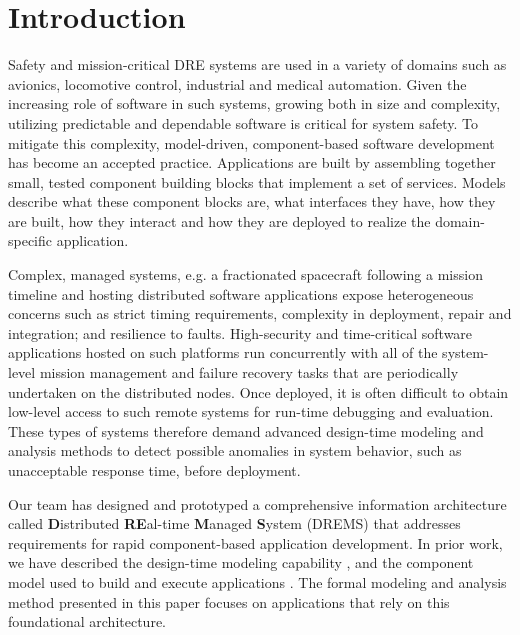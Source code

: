 \vspace{-0.3in}

\section{Introduction}\label{sec:Introduction}

\vspace{-0.1in}

Safety and mission-critical DRE systems are used in a variety of domains such as avionics, locomotive control, industrial and medical automation. Given the increasing role of software in such systems, growing both in size and complexity, utilizing predictable and dependable software is critical for system safety. To mitigate this complexity, model-driven, component-based software development has become an accepted practice. Applications are built by assembling together small, tested component building blocks that implement a set of services. Models describe what these component blocks are, what interfaces they have, how they are built, how they interact and how they are deployed to realize the domain-specific application. 

Complex, managed systems, e.g. a fractionated spacecraft following a mission timeline and hosting distributed software applications expose heterogeneous concerns such as strict timing requirements, complexity in deployment, repair and integration; and resilience to faults. High-security and time-critical software applications hosted on such platforms run concurrently with all of the system-level mission management and failure recovery tasks that are periodically undertaken on the distributed nodes. Once deployed, it is often difficult to obtain low-level access to such remote systems for run-time debugging and evaluation. These types of systems therefore demand advanced design-time modeling and analysis methods to detect possible anomalies in system behavior, such as unacceptable response time, before deployment. 

Our team has designed and prototyped a comprehensive information architecture called \textbf{D}istributed \textbf{RE}al-time \textbf{M}anaged \textbf{S}ystem (DREMS) \cite{ISIS_F6_Aerospace:12,DREMS13Software} that addresses requirements for rapid component-based application development. In prior work, we have described the design-time modeling capability \cite{ISIS_F6_SFFMT:13}, and the component model used to build and execute applications \cite{ISIS_F6_ISORC:13}. The formal modeling and analysis method presented in this paper focuses on applications that rely on this foundational architecture. 

